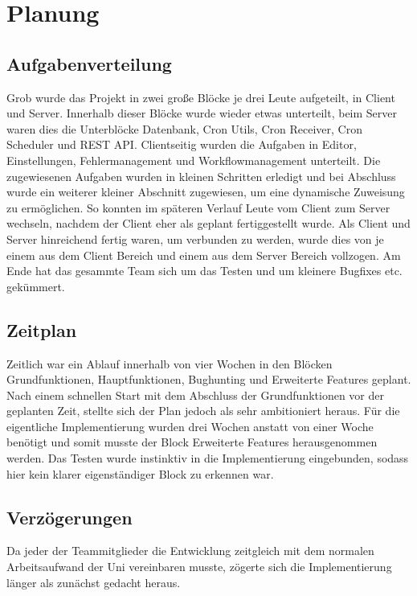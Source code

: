 \chapter{Planung}
    
    \section{Aufgabenverteilung}
    Grob wurde das Projekt in zwei große Blöcke je drei Leute aufgeteilt, in Client und Server. Innerhalb dieser Blöcke wurde wieder etwas unterteilt, beim Server waren dies die Unterblöcke Datenbank, Cron Utils, Cron Receiver, Cron Scheduler und REST API. Clientseitig wurden die Aufgaben in Editor, Einstellungen, Fehlermanagement und Workflowmanagement unterteilt. Die zugewiesenen Aufgaben wurden in kleinen Schritten erledigt und bei Abschluss wurde ein weiterer kleiner Abschnitt zugewiesen, um eine dynamische Zuweisung zu ermöglichen. So konnten im späteren Verlauf Leute vom Client zum Server wechseln, nachdem der Client eher als geplant fertiggestellt wurde. Als Client und Server hinreichend fertig waren, um verbunden zu werden, wurde dies von je einem aus dem Client Bereich und einem aus dem Server Bereich vollzogen. Am Ende hat das gesammte Team sich um das Testen und um kleinere Bugfixes etc. gekümmert. 
    
    \section{Zeitplan}
    Zeitlich war ein Ablauf innerhalb von vier Wochen in den Blöcken Grundfunktionen, Hauptfunktionen, Bughunting und Erweiterte Features geplant. Nach einem schnellen Start mit dem Abschluss der Grundfunktionen vor der geplanten Zeit, stellte sich der Plan jedoch als sehr ambitioniert heraus. Für die eigentliche Implementierung wurden drei Wochen anstatt von einer Woche benötigt und somit musste der Block Erweiterte Features herausgenommen werden. Das Testen wurde instinktiv in die Implementierung eingebunden, sodass hier kein klarer eigenständiger Block zu erkennen war. 
    
    \section{Verzögerungen}
    Da jeder der Teammitglieder die Entwicklung zeitgleich mit dem normalen Arbeitsaufwand der Uni vereinbaren musste, zögerte sich die Implementierung länger als zunächst gedacht heraus.
    
